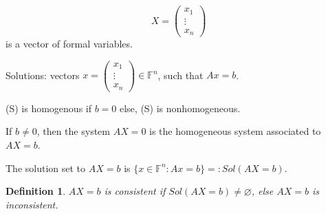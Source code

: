 \documentclass[12pt]{article}
\newtheorem{definition}{Definition}[subsection]
\newcommand{\mF}{{\mathbb{F}}}
\begin{document}
\[
	X = 
	\begin{pmatrix}
		x_1		\\
		\vdots	\\
		x_n
	\end{pmatrix}
\]
is a vector of formal variables. 

Solutions: vectors $x = \begin{pmatrix}x_1 \\ \vdots \\ x_n \end{pmatrix} \in
\mF^n$, such that $Ax = b$. 

(S) is homogenous if $b = 0$ else, (S) is nonhomogeneous. 

If $b\neq 0$, then the system $AX = 0$ is the homogeneous system associated to
$AX = b$. 

The solution set to $AX = b$ is $\{x \in \mF^n : Ax = b\} =: Sol(AX=b)$. \\

\begin{definition}
	$AX = b$ is consistent if $Sol(AX=b) \neq \varnothing$, else $AX=b$ is 
	inconsistent. \\
\end{definition}
\end{document}
